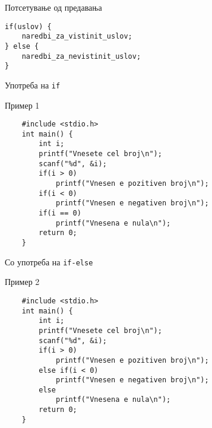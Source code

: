 

\begin{frame}[fragile]{Потсетување од предавања}
\begin{center}
\begin{lstlisting}
if(uslov) {
    naredbi_za_vistinit_uslov;
} else {
    naredbi_za_nevistinit_uslov;
}
\end{lstlisting}
\end{center}
\end{frame}

\begin{frame}[fragile]{Употреба на \texttt{if}}
	\begin{exampleblock}{Пример 1}
	\begin{lstlisting}
	#include <stdio.h> 
	int main() { 
	    int i;
	    printf("Vnesete cel broj\n");
	    scanf("%d", &i);
	    if(i > 0) 
	        printf("Vnesen e pozitiven broj\n");
	    if(i < 0)
	        printf("Vnesen e negativen broj\n"); 
	    if(i == 0)
	        printf("Vnesena e nula\n"); 
	    return 0; 
	}
	\end{lstlisting}
	\end{exampleblock}
\end{frame}

\begin{frame}[fragile]{Со употреба на \texttt{if-else}}

	\begin{exampleblock}{Пример 2}
	\begin{lstlisting}
	#include <stdio.h>
	int main() {
	    int i;
	    printf("Vnesete cel broj\n");
	    scanf("%d", &i); 
	    if(i > 0)
	        printf("Vnesen e pozitiven broj\n");
	    else if(i < 0)
	        printf("Vnesen e negativen broj\n"); 
	    else
	        printf("Vnesena e nula\n"); 
	    return 0; 
	}
	\end{lstlisting}
	\end{exampleblock}

\end{frame}

